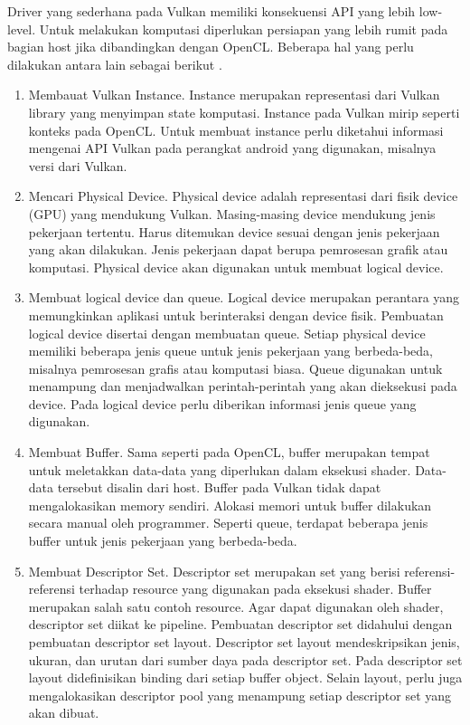 Driver yang sederhana pada Vulkan memiliki konsekuensi API yang lebih low-level. Untuk melakukan komputasi diperlukan persiapan yang lebih rumit pada bagian host jika dibandingkan dengan OpenCL. Beberapa hal yang perlu dilakukan antara lain sebagai berikut \cite{vkspec}.

\begin{enumerate}
\item Membauat Vulkan Instance. Instance merupakan representasi dari Vulkan library yang menyimpan state komputasi. Instance pada Vulkan mirip seperti konteks pada OpenCL. Untuk membuat instance perlu diketahui informasi mengenai API Vulkan pada perangkat android yang digunakan, misalnya versi dari Vulkan.

\item Mencari Physical Device. Physical device adalah representasi dari fisik device (GPU) yang mendukung Vulkan. Masing-masing device mendukung jenis pekerjaan tertentu. Harus ditemukan device sesuai dengan jenis pekerjaan yang akan dilakukan. Jenis pekerjaan dapat berupa pemrosesan grafik atau komputasi. Physical device akan digunakan untuk membuat logical device.

\item Membuat logical device dan queue. Logical device merupakan perantara yang memungkinkan aplikasi untuk berinteraksi dengan device fisik. Pembuatan logical device disertai dengan membuatan queue. Setiap physical device memiliki beberapa jenis queue untuk jenis pekerjaan yang berbeda-beda, misalnya pemrosesan grafis atau komputasi biasa. Queue digunakan untuk menampung dan menjadwalkan perintah-perintah yang akan dieksekusi pada device. Pada logical device perlu diberikan informasi jenis queue yang digunakan.

\item Membuat Buffer. Sama seperti pada OpenCL, buffer merupakan tempat untuk meletakkan data-data yang diperlukan dalam eksekusi shader. Data-data tersebut disalin dari host. Buffer pada Vulkan tidak dapat mengalokasikan memory sendiri. Alokasi memori untuk buffer dilakukan secara manual oleh programmer. Seperti queue, terdapat beberapa jenis buffer untuk jenis pekerjaan yang berbeda-beda.

\item Membuat Descriptor Set. Descriptor set merupakan set yang berisi referensi-referensi terhadap resource yang digunakan pada eksekusi shader. Buffer merupakan salah satu contoh resource. Agar dapat digunakan oleh shader, descriptor set diikat ke pipeline. Pembuatan descriptor set didahului dengan pembuatan descriptor set layout. Descriptor set layout mendeskripsikan jenis, ukuran, dan urutan dari sumber daya pada descriptor set. Pada descriptor set layout didefinisikan binding dari setiap buffer object. Selain layout, perlu juga mengalokasikan descriptor pool yang menampung setiap descriptor set yang akan dibuat.


\end{enumerate}
